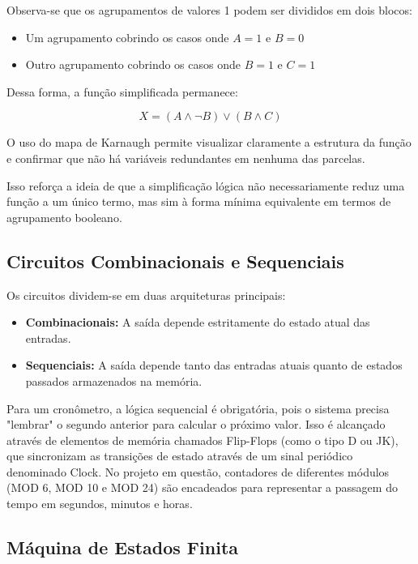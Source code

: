 \documentclass[a4paper,12pt]{article}
\begin{document}
Observa-se que os agrupamentos de valores 1 podem ser divididos em dois blocos:

\begin{itemize}
    \item Um agrupamento cobrindo os casos onde $A = 1$ e $B = 0$
    \item Outro agrupamento cobrindo os casos onde $B = 1$ e $C = 1$
\end{itemize}

Dessa forma, a função simplificada permanece:

\[
X = (A \land \lnot B) \lor (B \land C)
\]

O uso do mapa de Karnaugh permite visualizar claramente a estrutura da função e confirmar que não há variáveis redundantes em nenhuma das parcelas.

Isso reforça a ideia de que a simplificação lógica não necessariamente reduz uma função a um único termo, mas sim à forma mínima equivalente em termos de agrupamento booleano.


\subsection{Circuitos Combinacionais e Sequenciais}

Os circuitos dividem-se em duas arquiteturas principais: 

\begin{itemize}
 \item \textbf{Combinacionais:} A saída depende estritamente do estado atual das entradas.
 \item \textbf{Sequenciais:} A saída depende tanto das entradas atuais quanto de estados passados armazenados na memória. 
\end{itemize} 

Para um cronômetro, a lógica sequencial é obrigatória, pois o sistema precisa "lembrar" o segundo anterior para calcular o próximo valor. 
Isso é alcançado através de elementos de memória chamados Flip-Flops (como o tipo D ou JK), que sincronizam as transições de estado através de um sinal periódico denominado Clock. 
No projeto em questão, contadores de diferentes módulos (MOD 6, MOD 10 e MOD 24) são encadeados para representar a passagem do tempo em segundos, minutos e horas.

\subsection{Máquina de Estados Finita}
\end{document}

